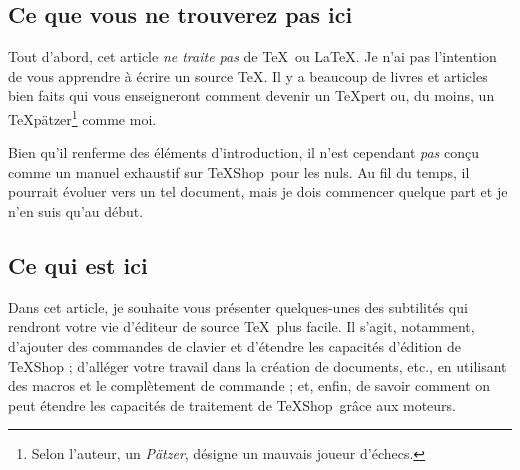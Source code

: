 \documentclass[11pt,french]{article}
\newcommand{\TS}{\textsf{\TeX Shop}}
\begin{document}
\subsection{Ce que vous ne trouverez pas ici}

Tout d'abord, cet article \emph{ne traite pas} de \TeX\ ou \LaTeX. Je n'ai pas l'intention de vous apprendre à écrire un source \TeX{}. Il y a beaucoup de livres et articles bien faits qui vous enseigneront comment devenir un \TeX pert ou, du moins, un \TeX pätzer\footnote{Selon l'auteur, un \emph{Pätzer}, désigne un mauvais joueur d'échecs.} comme moi.
 
Bien qu'il renferme des éléments d'introduction, il n'est cependant \emph{pas} conçu comme un manuel exhaustif sur \TS\ pour les nuls. Au fil du temps, il pourrait évoluer vers un tel document, mais je dois commencer quelque part et je n'en suis qu'au début.

%

\subsection{Ce qui est ici}

Dans cet article, je souhaite vous présenter quelques-unes des subtilités qui rendront votre vie d'éditeur de source \TeX\ plus facile. Il s'agit, notamment, d'ajouter des commandes de clavier et d'étendre les capacités d'édition de \TS{} ; d'alléger votre travail dans la création de documents, etc., en utilisant des macros et le complètement de commande ; et, enfin, de savoir comment on peut étendre les capacités de traitement de \TS\ grâce aux moteurs.

\end{document}
